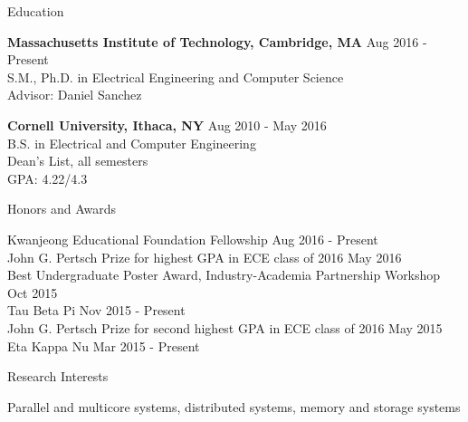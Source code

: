 \documentclass{resume} %
\begin{document}

\begin{rSection}{Education}

{\bf Massachusetts Institute of Technology, Cambridge, MA} \hfill { Aug 2016 - Present} \\ 
S.M., Ph.D. in Electrical Engineering and Computer Science \\
Advisor: Daniel Sanchez

{\bf Cornell University, Ithaca, NY} \hfill { Aug 2010 - May 2016} \\ 
B.S. in Electrical and Computer Engineering \\
Dean's List, all semesters \\
GPA: 4.22/4.3 

\end{rSection}


\begin{rSection}{Honors and Awards}

Kwanjeong Educational Foundation Fellowship \hfill {Aug 2016 - Present} \\
John G. Pertsch Prize for highest GPA in ECE class of 2016 \hfill{May 2016} \\
Best Undergraduate Poster Award, Industry-Academia Partnership Workshop \hfill { Oct 2015} \\
Tau Beta Pi \hfill { Nov 2015 - Present} \\
John G. Pertsch Prize for second highest GPA in ECE class of 2016 \hfill { May 2015} \\
Eta Kappa Nu \hfill { Mar 2015 - Present} 

\end{rSection}


\begin{rSection}{Research Interests}

Parallel and multicore systems, distributed systems, memory and storage systems

\end{rSection}
\end{document}
